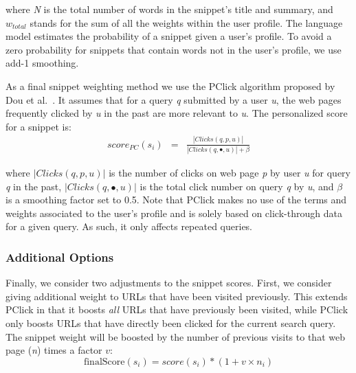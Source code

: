 \documentclass{sig-alternate}
\begin{document}
where \emph{N} is the total number of words in the snippet's title and summary, and \begin{math} w{_{total}} \end{math} stands for the sum of all the weights within the user profile. The language model estimates the probability of a snippet given a user's profile. To avoid a zero probability for snippets that contain words not in the user's profile, we use add-1 smoothing.

\vspace{3mm}

As a final snippet weighting method we use the PClick algorithm proposed by Dou et al.~\cite{Dou:Song}. It assumes that for a query \emph{q} submitted by a user \emph{u}, the web pages frequently clicked by \emph{u} in the past are more relevant to \emph{u}. The personalized score for a snippet is: 
\begin{eqnarray}
score_{PC}(s{_{i}}) & = & \frac{|Clicks(q,p,u)|}{|Clicks(q,\bullet ,u)| + \beta}
\end{eqnarray}

where \begin{math} |Clicks(q,p,u)| \end{math} is the number of clicks on web page \emph{p} by user \emph{u} for query \emph{q} in the past, \begin{math} |Clicks(q,\bullet ,u)| \end{math} is the total click number on query \emph{q} by  \emph{u}, and \begin{math} \beta \end{math} is a smoothing factor set to 0.5.
Note that PClick makes no use of the terms and weights associated to the user's profile and is solely based on click-through data for a given query. As such, it only affects repeated queries.

\subsubsection{Additional Options}

Finally, we consider two adjustments to the snippet scores. First, we consider giving additional weight to URLs that have been visited previously. This extends PClick in that it boosts \emph{all} URLs that have previously been visited, while PClick only boosts URLs that have directly been clicked for the current search query. The snippet weight will be boosted by the number of previous visits to that web page (\emph{n}) times a factor $v$:
\begin{equation}
\mathrm{finalScore}(s_i) = score(s_i) * (1 + v \times n_i)
\label{eqn:visited}
\end{equation}
\end{document}
